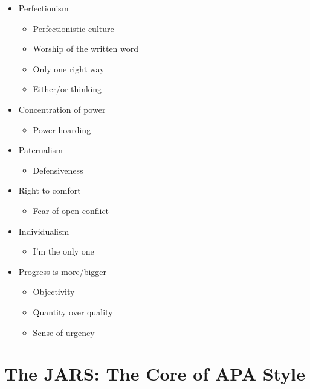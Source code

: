 \documentclass[
  11pt,
]{book}
\providecommand{\tightlist}{%
  \setlength{\itemsep}{0pt}\setlength{\parskip}{0pt}}
\begin{document}
\begin{itemize}
\tightlist
\item
  Perfectionism

  \begin{itemize}
  \tightlist
  \item
    Perfectionistic culture
  \item
    Worship of the written word
  \item
    Only one right way
  \item
    Either/or thinking
  \end{itemize}
\item
  Concentration of power

  \begin{itemize}
  \tightlist
  \item
    Power hoarding
  \end{itemize}
\item
  Paternalism

  \begin{itemize}
  \tightlist
  \item
    Defensiveness
  \end{itemize}
\item
  Right to comfort

  \begin{itemize}
  \tightlist
  \item
    Fear of open conflict
  \end{itemize}
\item
  Individualism

  \begin{itemize}
  \tightlist
  \item
    I'm the only one
  \end{itemize}
\item
  Progress is more/bigger

  \begin{itemize}
  \tightlist
  \item
    Objectivity
  \item
    Quantity over quality
  \item
    Sense of urgency
  \end{itemize}
\end{itemize}

\section{The JARS: The Core of APA Style}\label{the-jars-the-core-of-apa-style}
\end{document}
